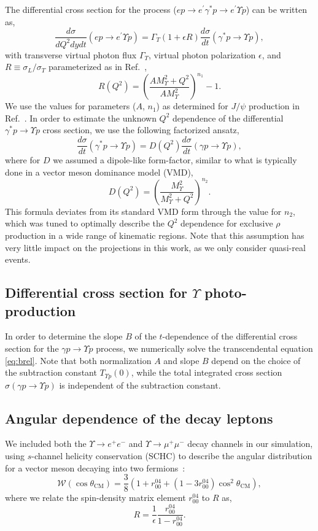 \documentclass[prd,amsmath,twocolumn,floatfix,amssymb, preprintnumbers, linenumbers,nofootinbib, superscriptaddress]{revtex4}
\newcommand{\beq}{\begin{equation}}
\newcommand{\eeq}{\end{equation}}
\begin{document}
The differential cross section for the process ($e p \to e^\prime \gamma^* p \to e^\prime \Upsilon p$) can be written as,
\beq
\frac{d\sigma}{dQ^2dydt}(e p \to e^\prime \Upsilon p) = 
\Gamma_T(1+\epsilon R)
\frac{d\sigma}{dt}(\gamma^* p \to \Upsilon p),
\eeq
with transverse virtual photon flux $\Gamma_T$, virtual photon polarization $\epsilon$, and 
$R\equiv\sigma_L/\sigma_T$ parameterized as in Ref.~\cite{Martynov:2002ez},
\beq
R(Q^2) = \left(\frac{A M_\Upsilon^2 + Q^2}{A M_\Upsilon^2}\right)^{n_1} - 1.
\eeq
We use the values for parameters ($A$, $n_1$) as determined for $J/\psi$ production in Ref.~\cite{Fiore:2009xk}.
In order to estimate the unknown $Q^2$ dependence of the differential $\gamma^* p \to \Upsilon p$ cross section, we use the following factorized ansatz,
\beq
\frac{d\sigma}{dt}(\gamma^* p \to \Upsilon p) = D(Q^2) \frac{d\sigma}{dt}(\gamma p \to \Upsilon p),
\eeq
where for $D$ we assumed a dipole-like form-factor, similar to what is typically
done in a vector meson dominance model (VMD),
\beq
D(Q^2) = \left(\frac{M_\Upsilon^2}{M_\Upsilon^2 + Q^2}\right)^{n_2}.
\eeq
This formula deviates from its standard VMD form through the value for $n_2$, which was
tuned to optimally describe the $Q^2$ dependence for exclusive $\rho$ production in a wide range
of kinematic regions.
Note that this assumption has very little impact on the projections in this work, as we only consider quasi-real events.

\subsection{Differential cross section for $\Upsilon$ photo-production}

In order to determine the slope $B$ of the $t$-dependence of the differential cross section for 
the $\gamma p \to \Upsilon p$ process, we numerically solve the transcendental equation \eqref{eq:brel}.
Note that both  normalization $A$ and slope $B$ depend on the choice of the subtraction
constant $T_{\Upsilon p} (0)$, while the total integrated cross section 
$\sigma(\gamma p \to \Upsilon p)$ is independent of the subtraction constant.

\subsection{Angular dependence of the decay leptons}

We included both the $\Upsilon \to e^+e^-$ and $\Upsilon \to \mu^+\mu^-$ decay channels
in our simulation, using $s$-channel helicity conservation (SCHC) to describe the
angular distribution for a vector meson decaying into two fermions~\cite{Breitweg:1998nh,Chekanov:2002xi,Schilling:1973ag}:
\beq
\mathcal{W}(\cos\theta_\text{CM}) = 
\frac{3}{8}(1+r^{04}_{00}+(1-3r_{00}^{04})\cos^2\theta_\text{CM}),
\eeq
where we relate the spin-density matrix element $r^{04}_{00}$ to $R$ as,
\beq
R = \frac{1}{\epsilon}\frac{r^{04}_{00}}{1-r^{04}_{00}}.
\eeq
\end{document}
